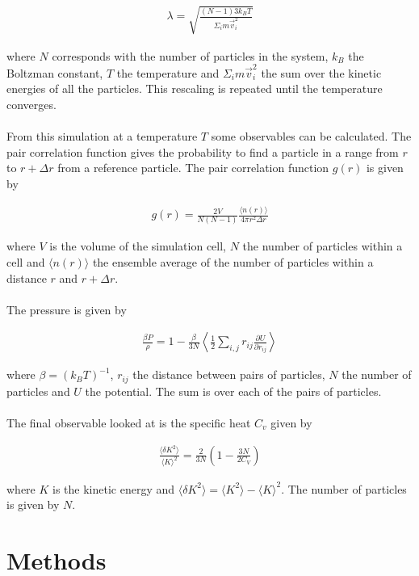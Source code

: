 \documentclass[10 pt, a4paper]{article}
\begin{document}
\begin{align}
\lambda = \sqrt{\frac{(N-1) 3 k_B T}{\Sigma_i m\vec{v}_i^2}}
\end{align}

where $N$ corresponds with the number of particles in the system, $k_B$ the Boltzman constant, $T$ the temperature and $\Sigma_i m \vec{v}_i^2$ the sum over the kinetic energies of all the particles. This rescaling is repeated until the temperature converges.
\\
\\
From this simulation at a temperature $T$ some observables can be calculated. The pair correlation function gives the probability to find a particle in a range from $r$ to $r + \Delta r$ from a reference particle. The pair correlation function $g(r)$ is given by

\begin{align}
g(r) = \frac{2V}{N(N-1)} \frac{\langle n(r) \rangle}{4 \pi r^2 \Delta r}
\end{align}

where $V$ is the volume of the simulation cell, $N$ the number of particles within a cell and $\langle n(r) \rangle$ the ensemble average of the number of particles within a distance $r$ and $r + \Delta r$.
\\
\\
The pressure is given by 

\begin{align}
\frac{\beta P}{\rho} = 1 - \frac{\beta}{3 N} \left<\frac{1}{2} \sum_{i,j} r_{ij} \frac{\partial U}{\partial r_{ij}} \right>
\end{align}

where $\beta = (k_B T)^{-1}$, $r_{ij}$ the distance between pairs of particles, $N$ the number of particles and $U$ the potential. The sum is over each of the pairs of particles.
\\
\\
The final observable looked at is the specific heat $C_v$ given by

\begin{align}
\frac{\langle \delta K^2 \rangle}{\langle K \rangle^2} = \frac{2}{3N}
\left(1-\frac{3N}{2 C_V}\right)
\end{align}

where $K$ is the kinetic energy and $\langle \delta K^2 \rangle = \langle K^2 \rangle - \langle K \rangle ^2$. The number of particles is given by $N$.

\section{Methods} \label{sec:meth}
\end{document}
